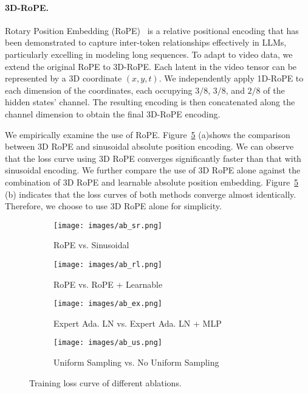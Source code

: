 \documentclass{article} \usepackage{iclr2024_conference,times}
\begin{document}
\paragraph{3D-RoPE.}
Rotary Position Embedding (RoPE)~\cite{su2024roformer} is a relative positional encoding that has been demonstrated to capture inter-token relationships effectively in LLMs, particularly excelling in modeling long sequences. 
To adapt to video data, we extend the original RoPE to 3D-RoPE. 
Each latent in the video tensor can be represented by a 3D coordinate $(x, y, t)$.
We independently apply 1D-RoPE to each dimension of the coordinates, each occupying $3/8$, $3/8$, and $2/8$ of the hidden states' channel. 
The resulting encoding is then concatenated along the channel dimension to obtain the final 3D-RoPE encoding. 

We empirically examine the use of RoPE. 
Figure~\ref{fig:subfigures} (a)shows the comparison between 3D RoPE and sinusoidal absolute position encoding. 
We can observe that the loss curve using 3D RoPE converges significantly faster than that with sinusoidal encoding. 
We further compare the use of 3D RoPE alone against the combination of 3D RoPE and learnable absolute position embedding. 
Figure~\ref{fig:subfigures} (b) indicates that the loss curves of both methods converge almost identically. 
Therefore, we choose to use 3D RoPE alone for simplicity. 


\begin{figure}[h]
    \centering
    \begin{subfigure}[b]{0.46\textwidth}
        \texttt{[image: images/ab\_sr.png]}
        \caption{RoPE vs. Sinusoidal}
        \label{fig:rope-sin}
    \end{subfigure}
    \begin{subfigure}[b]{0.48\textwidth}
        \texttt{[image: images/ab\_rl.png]}
        \caption{RoPE vs. RoPE + Learnable}
        \label{fig:rope-learnable}
    \end{subfigure}
    \begin{subfigure}[b]{0.46\textwidth}
        \texttt{[image: images/ab\_ex.png]}
        \caption{Expert Ada. LN vs. Expert Ada. LN + MLP}
        \label{fig:expert}
    \end{subfigure}
    \begin{subfigure}[b]{0.48\textwidth}
        \texttt{[image: images/ab\_us.png]}
        \caption{Uniform Sampling vs. No Uniform Sampling}
        \label{fig:uniform-sampling}
    \end{subfigure}

    \caption{Training loss curve of different ablations.}
    \label{fig:subfigures}
\end{figure}
\end{document}
